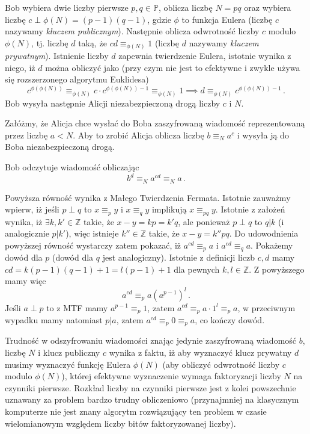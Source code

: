 \documentclass{myclass}
\begin{document}
Bob wybiera dwie liczby pierwsze \(p,q\in\mathbb{P}\), oblicza liczbę \(N = pq\) oraz wybiera liczbę
\(c \perp \phi(N) = (p-1)(q-1)\), gdzie \(\phi\) to funkcja Eulera (liczbę \(c\) nazywamy
\textit{kluczem publicznym}). Następnie oblicza odwrotność liczby \(c\) modulo \(\phi(N)\), tj.
liczbę \(d\) taką, że \(cd \equiv_{\phi(N)} 1\) (liczbę \(d\) nazywamy \textit{kluczem prywatnym}).
Istnienie liczby \(d\) zapewnia twierdzenie Eulera, istotnie wynika z niego, iż \(d\) można obliczyć
jako (przy czym nie jest to efektywne i zwykle używa się rozszerzonego algorytmu Euklidesa)
\begin{equation*}
    c^{\phi(\phi(N))} \equiv_{\phi(N)} c\cdot c^{\phi(\phi(N))-1} \equiv_{\phi(N)} 1  \implies d \equiv_{\phi(N)} c^{\phi(\phi(N))-1}\,.
\end{equation*}
Bob wysyła następnie Alicji niezabezpieczoną drogą liczby \(c\) i \(N\). 

Załóżmy, że Alicja chce wysłać do Boba zaszyfrowaną wiadomość reprezentowaną przez liczbę \(a < N\).
Aby to zrobić Alicja oblicza liczbę \(b \equiv_N a^c\) i wysyła ją do Boba niezabezpieczoną drogą.

Bob odczytuje wiadomość obliczając
\begin{equation*}
    b^d \equiv_N a^{cd} \equiv_N a\,.
\end{equation*}

Powyższa równość wynika z Małego Twierdzenia Fermata. Istotnie zauważmy wpierw, iż jeśli \(p \perp
q\) to \(x \equiv_p y\) i \(x \equiv_q y\) implikują \(x \equiv_{pq} y\). Istotnie z założeń wynika,
iż \(\exists k,k' \in \mathbb{Z}\) takie, że \(x - y = kp = k'q\), ale ponieważ \(p \perp q\) to \(q
| k\) (i analogicznie \(p | k'\)), więc istnieje \(k'' \in \mathbb{Z}\) takie, że \(x - y = k''
pq\). Do udowodnienia powyższej równość wystarczy zatem pokazać, iż \(a^{cd} \equiv_p a\) i \(a^{cd}
\equiv_q  a\). Pokażemy dowód dla \(p\) (dowód dla \(q\) jest analogiczny). Istotnie z definicji
liczb \(c,d\) mamy \(cd = k(p-1)(q-1) + 1 = l(p-1) + 1\) dla pewnych \(k,l\in\mathbb{Z}\). Z
powyższego mamy więc
\begin{equation*}
    a^{cd} \equiv_p a(a^{p-1})^l\,.
\end{equation*}
Jeśli \(a \perp p\) to z MTF mamy \(a^{p-1} \equiv_p 1\), zatem \(a^{cd} \equiv_p a\cdot1^l \equiv_p
a\), w przeciwnym wypadku mamy natomiast \(p | a\), zatem \(a^{cd} \equiv_p 0 \equiv_p a\), co
kończy dowód.

Trudność w odszyfrowaniu wiadomości znając jedynie zaszyfrowaną wiadomość \(b\), liczbę \(N\) i
klucz publiczny \(c\) wynika z faktu, iż aby wyznaczyć klucz prywatny \(d\) musimy wyznaczyć funkcję
Eulera \(\phi(N)\) (aby obliczyć odwrotność liczby \(c\) modulo \(\phi(N)\)), której efektywne
wyznaczenie wymaga faktoryzacji liczby \(N\) na czynniki pierwsze. Rozkład liczby na czynniki
pierwsze jest z kolei powszechnie uznawany za problem bardzo trudny obliczeniowo (przynajmniej na
klasycznym komputerze nie jest znany algorytm rozwiązujący ten problem w czasie wielomianowym
względem liczby bitów faktoryzowanej liczby).
\end{document}
